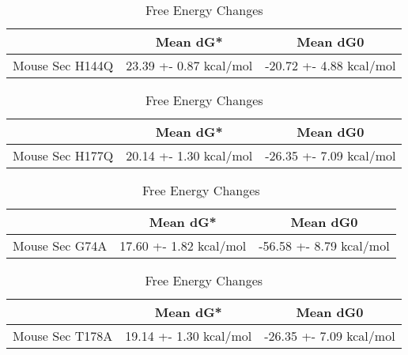                 \begin{table}[ht]
                  \centering
                  \begin{tabular}{|c|c|c|}
                  \hline
                    & Mean dG* & Mean dG0 \\
                  \hline
                  Mouse Sec H144Q & 23.39 +- 0.87 kcal/mol & -20.72 +- 4.88 kcal/mol \\
                  \hline
                  \end{tabular}
                  \caption{Free Energy Changes}
                  \end{table}
             
                     
                \begin{table}[ht]
                  \centering
                  \begin{tabular}{|c|c|c|}
                  \hline
                    & Mean dG* & Mean dG0 \\
                  \hline
                  Mouse Sec H177Q & 20.14 +- 1.30 kcal/mol & -26.35 +- 7.09 kcal/mol \\
                  \hline
                  \end{tabular}
                  \caption{Free Energy Changes}
                  \end{table}
                  

                          \begin{table}[ht]
                            \centering
                            \begin{tabular}{|c|c|c|}
                            \hline
                              & Mean dG* & Mean dG0 \\
                            \hline
                            Mouse Sec G74A & 17.60 +- 1.82 kcal/mol & -56.58 +- 8.79 kcal/mol \\
                            \hline
                            \end{tabular}
                            \caption{Free Energy Changes}
                            \end{table}


                        \begin{table}[ht]
                            \centering
                            \begin{tabular}{|c|c|c|}
                            \hline
                              & Mean dG* & Mean dG0 \\
                            \hline
                            Mouse Sec  T178A & 19.14 +- 1.30 kcal/mol & -26.35 +- 7.09 kcal/mol \\
                            \hline
                            \end{tabular}
                            \caption{Free Energy Changes}
                            \end{table}


